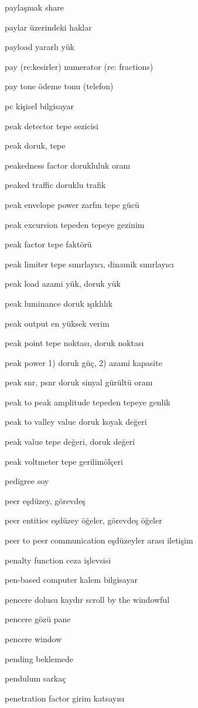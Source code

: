 \documentclass[12pt,fleqn]{article}\usepackage{../../common}
\begin{document}
paylaşmak share

paylar üzerindeki haklar

payload yararlı yük

pay (re:kesirler) numerator (re: fractions)

pay tone ödeme tonu (telefon)

pc kişisel bilgisayar

peak detector tepe sezicisi

peak doruk, tepe

peakedness factor dorukluluk oranı

peaked traffic doruklu trafik

peak envelope power zarfın tepe gücü

peak excursion tepeden tepeye gezinim

peak factor tepe faktörü

peak limiter tepe sınırlayıcı, dinamik sınırlayıcı

peak load azami yük, doruk yük

peak luminance doruk ışıklılık

peak output en yüksek verim

peak point tepe noktası, doruk noktası

peak power 1) doruk güç, 2) azami kapasite

peak snr, psnr doruk sinyal gürültü oranı

peak to peak amplitude tepeden tepeye genlik

peak to valley value doruk koyak değeri

peak value tepe değeri, doruk değeri

peak voltmeter tepe gerilimölçeri

pedigree soy

peer eşdüzey, görevdeş

peer entities eşdüzey öğeler, görevdeş öğeler

peer to peer communication eşdüzeyler arası iletişim

penalty function ceza işlevsisi

pen-based computer kalem bilgisayar

pencere dolusu kaydır scroll by the windowful

pencere gözü pane

pencere window

pending beklemede

pendulum sarkaç

penetration factor girim katsayısı
\end{document}
